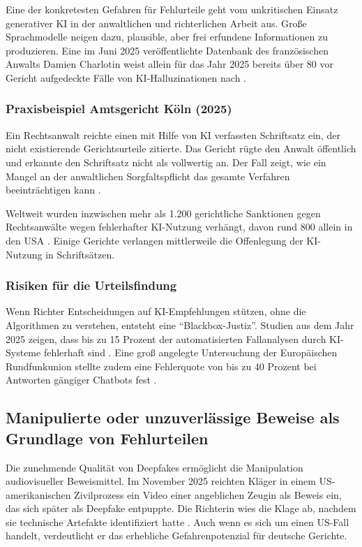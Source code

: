\documentclass[12pt,a4paper]{article}
\begin{document}
	Eine der konkretesten Gefahren für Fehlurteile geht vom unkritischen Einsatz generativer KI in der anwaltlichen und richterlichen Arbeit aus. Große Sprachmodelle neigen dazu, plausible, aber frei erfundene Informationen zu produzieren. Eine im Juni 2025 veröffentlichte Datenbank des französischen Anwalts Damien Charlotin weist allein für das Jahr 2025 bereits über 80 vor Gericht aufgedeckte Fälle von KI-Halluzinationen nach \cite{Charlotin2025}.
	
	\subsubsection{Praxisbeispiel Amtsgericht Köln (2025)}
	Ein Rechtsanwalt reichte einen mit Hilfe von KI verfassten Schriftsatz ein, der nicht existierende Gerichtsurteile zitierte. Das Gericht rügte den Anwalt öffentlich und erkannte den Schriftsatz nicht als vollwertig an. Der Fall zeigt, wie ein Mangel an der anwaltlichen Sorgfaltspflicht das gesamte Verfahren beeinträchtigen kann \cite{LTO2025a}.
	
	Weltweit wurden inzwischen mehr als 1.200 gerichtliche Sanktionen gegen Rechtsanwälte wegen fehlerhafter KI-Nutzung verhängt, davon rund 800 allein in den USA \cite{NPR2025}. Einige Gerichte verlangen mittlerweile die Offenlegung der KI-Nutzung in Schriftsätzen.
	
	\subsubsection{Risiken für die Urteilsfindung}
	Wenn Richter Entscheidungen auf KI-Empfehlungen stützen, ohne die Algorithmen zu verstehen, entsteht eine \enquote{Blackbox-Justiz}. Studien aus dem Jahr 2025 zeigen, dass bis zu 15 Prozent der automatisierten Fallanalysen durch KI-Systeme fehlerhaft sind \cite{LTO2025b}. Eine groß angelegte Untersuchung der Europäischen Rundfunkunion stellte zudem eine Fehlerquote von bis zu 40 Prozent bei Antworten gängiger Chatbots fest \cite{heise2025}.
	
	\subsection{Manipulierte oder unzuverlässige Beweise als Grundlage von Fehlurteilen}
	
	Die zunehmende Qualität von Deepfakes ermöglicht die Manipulation audiovisueller Beweismittel. Im November 2025 reichten Kläger in einem US-amerikanischen Zivilprozess ein Video einer angeblichen Zeugin als Beweis ein, das sich später als Deepfake entpuppte. Die Richterin wies die Klage ab, nachdem sie technische Artefakte identifiziert hatte \cite{LTO2025c}. Auch wenn es sich um einen US-Fall handelt, verdeutlicht er das erhebliche Gefahrenpotenzial für deutsche Gerichte.
	
\end{document}
